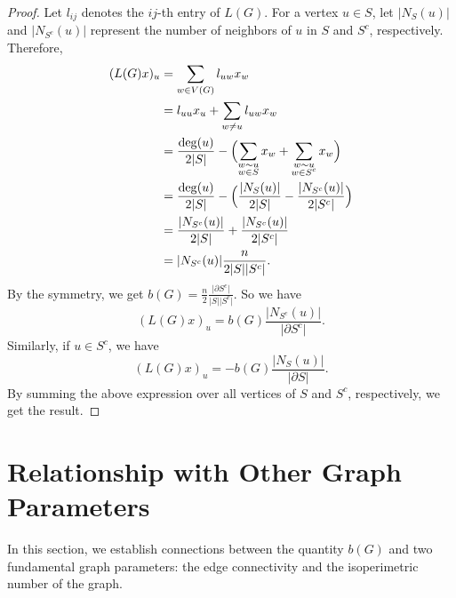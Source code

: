 \documentclass[12pt]{article}
\begin{document}
\begin{proof}

Let $l_{ij}$ denotes the $ij$-th entry of $L(G)$. For a vertex $u\in S$, let $\vert N_S(u) \vert$ and $\vert N_{S^c}(u) \vert$ represent the number of neighbors of $u$ in $S$ and $S^c$, respectively. Therefore, 
\begin{align*}
    (L(G)x)_u &=\sum_{w \in V(G)} l_{uw}x_{w}\\
    &=l_{uu}x_u+\sum_{w \neq u} l_{uw}x_{w}\\
    &=\frac{\deg(u)}{2\vert S \vert }-\Bigl(\sum_{\substack{w \sim u \\ w\in S}} x_w +\sum_{\substack{w \sim u \\ w\in S^c}} x_w\Bigl)\\ 
    & =\frac{\deg(u)}{2\vert S \vert}-\Bigl(\frac{\vert N_S(u) \vert}{2\vert S \vert }-\frac{\vert N_{S^c}(u) \vert}{2\vert S^c \vert}\Bigl)\\
    &=\frac{\vert N_{S^c}(u) \vert}{2\vert S \vert }+\frac{\vert N_{S^c}(u) \vert}{2\vert S^c \vert}\\
    &= \vert N_{S^c}(u) \vert \frac{n}{2\vert S\vert \vert S^c \vert}.
\end{align*}
By the symmetry, we  get 
$
b(G)= \frac{n}{2} \frac{\vert \partial S^c\vert}{\vert S\vert \vert S^c \vert}
$.
So we have 
$$
(L(G)x)_u=b(G) \frac{\vert N_{S^c}(u) \vert}{\vert \partial S^c \vert}.
$$
Similarly, if $u \in S^c$, we have
$$
(L(G)x)_u=-b(G) \frac{\vert N_{S}(u)\vert}{\vert \partial S \vert}.
$$
By summing the above expression over all vertices of $S$ and  $S^c$, respectively, we get the result.
\end{proof}


\section{Relationship with Other Graph Parameters}

In this section, we establish connections between the quantity $b(G)$ and two fundamental graph parameters: the edge connectivity and the isoperimetric number of the graph.
\end{document}
